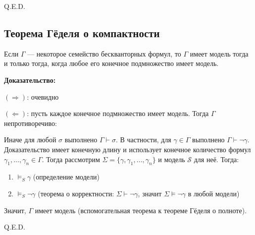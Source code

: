 \hfill Q.E.D.

\subsection{Теорема Гёделя о компактности}

Если $\Gamma$ --- некоторое семейство бескванторных формул, то $\Gamma$ имеет модель
тогда и только тогда, когда любое его конечное подмножество имеет модель.

\textbf{Доказательство:}

$(\Rightarrow)$: очевидно

$(\Leftarrow)$: пусть каждое конечное подмножество имеет модель. Тогда $\Gamma$ непротиворечиво:

{\footnotesize Иначе для любой $\sigma$ выполнено $\Gamma\vdash\sigma$. В частности, для $\gamma\in\Gamma$
выполнено $\Gamma\vdash\neg\gamma$. Доказательство имеет конечную длину и использует конечное
количество формул $\gamma_1,\dots,\gamma_n\in\Gamma$. Тогда рассмотрим $\Sigma = \{\gamma,\gamma_1,\dots,\gamma_n\}$
и модель $\mathcal{S}$ для неё. Тогда:
\begin{enumerate}
\item $\models_{S}\gamma$ (определение модели)
\item $\models_{S}\neg\gamma$ (теорема о корректности: $\Sigma\vdash\neg\gamma$, значит $\Sigma\models\neg\gamma$ в любой модели)
\end{enumerate}}

Значит, $\Gamma$ имеет модель (вспомогательная теорема к теореме Гёделя о полноте).

\hfill Q.E.D.   